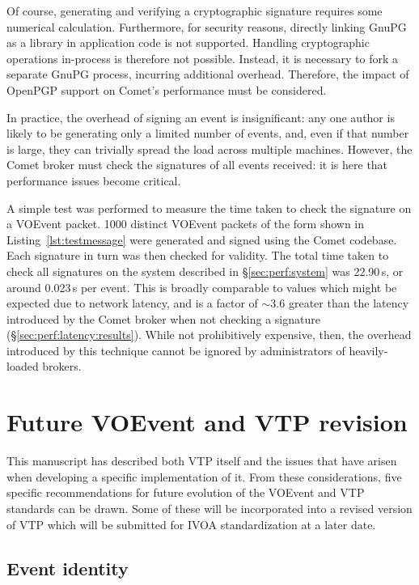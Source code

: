 \documentclass[5p,authoryear]{elsarticle}
\begin{document}
Of course, generating and verifying a cryptographic signature requires some
numerical calculation. Furthermore, for security reasons, directly linking
GnuPG as a library in application code is not supported. Handling
cryptographic operations in-process is therefore not possible. Instead, it is
necessary to fork a separate GnuPG process, incurring additional overhead.
Therefore, the impact of OpenPGP support on Comet's performance must be
considered.

In practice, the overhead of signing an event is insignificant: any one author
is likely to be generating only a limited number of events, and, even if that
number is large, they can trivially spread the load across multiple machines.
However, the Comet broker must check the signatures of all events received: it
is here that performance issues become critical.

A simple test was performed to measure the time taken to check the signature
on a VOEvent packet. 1000 distinct VOEvent packets of the form shown in
Listing~\ref{lst:testmessage} were generated and signed using the Comet
codebase. Each signature in turn was then checked for validity. The total
time taken to check all signatures on the system described in
\S\ref{sec:perf:system} was 22.90\,s, or around 0.023\,s per event. This is
broadly comparable to values which might be expected due to network latency,
and is a factor of $\sim3.6$ greater than the latency introduced by the Comet
broker when not checking a signature (\S\ref{sec:perf:latency:results}). While
not prohibitively expensive, then, the overhead introduced by this technique
cannot be ignored by administrators of heavily-loaded brokers.

\section{Future VOEvent and VTP revision}
\label{sec:future}

This manuscript has described both VTP itself and the issues that have arisen
when developing a specific implementation of it.  From these considerations,
five specific recommendations for future evolution of the VOEvent and VTP
standards can be drawn. Some of these will be incorporated into a revised
version of VTP which will be submitted for IVOA standardization at a later
date.

\subsection{Event identity}
\label{sec:future:identity}
\end{document}
